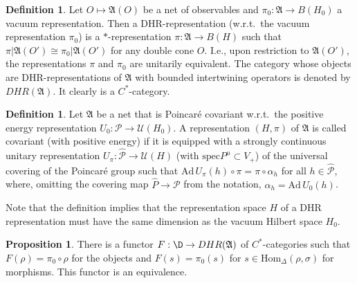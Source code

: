 \documentclass[11pt]{article}
\newcommand{\alg}[1]{\mathfrak{#1}}
\theoremstyle{definition}
\newtheorem{prop}[thm]{Proposition}
\theoremstyle{definition}
\newtheorem{defn}[thm]{Definition}
\theoremstyle{remark}
\def\2#1{{\mathcal #1}}
\newcommand{\Hom}{\mathrm{Hom}}
\newcommand{\rarr}{\rightarrow}
\begin{document}
\begin{defn} \label{def-dhr} Let $O\mapsto \alg{A}(O)$
  be a net of observables and $\pi_0:\alg{A}\rarr
  B(H_0)$ a vacuum representation.  Then a
  DHR-representation (w.r.t.\ the vacuum representation
  $\pi_0$) is a $*$-representation $\pi:\alg{A}\rarr
  B(H)$ such that
  $\pi|\alg{A}(O')\cong\pi_0|\alg{A}(O')$ for any
  double cone $O$.  I.e., upon restriction to
  $\alg{A}(O')$, the representations $\pi$ and $\pi_0$
  are unitarily equivalent. The category whose objects
  are DHR-representations of $\alg{A}$ with bounded
  intertwining operators is denoted by
  $DHR(\alg{A})$. It clearly is a $C^*$-category.
\end{defn}

\def\6#1{{\mathfrak #1}}

\begin{defn} \label{def-cov} Let $\6A$ be a net that is
  Poincar\'e covariant w.r.t.\ the positive energy
  representation $U_0:\2P\rarr\2U(H_0)$. A
  representation $(H,\pi)$ of $\6A$ is called covariant
  (with positive energy) if it is equipped with a
  strongly continuous unitary representation
  $U_\pi:\widehat{\2P}\rarr\2U(H)$ (with $\mathrm{spec}
  P^\mu\subset V_+$) of the universal covering of the
  Poincar\'e group such that
  $\mathrm{Ad}\,U_\pi(h)\circ\pi=\pi\circ\alpha_h$ for
  all $h\in\widehat{\2P}$, where, omitting the covering
  map $\widehat{P}\rarr\2P$ from the notation,
  $\alpha_h=\mathrm{Ad}\,U_0(h)$. \end{defn}

Note that the definition implies that the representation space $H$ of a DHR representation must have the same
dimension as the vacuum Hilbert space $H_0$.

\begin{prop} \label{prop-dhr} There is a functor $F:
  \D\rarr DHR(\alg{A})$ of $C^*$-categories such that
  $F(\rho)=\pi_0\circ\rho$ for the objects and
  $F(s)=\pi_0(s)$ for $s\in\Hom_\Delta(\rho,\sigma)$
  for morphisms. This functor is an equivalence.
\end{prop}
\end{document}
